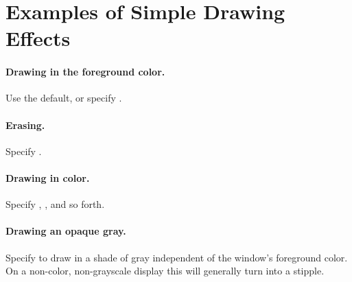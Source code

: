 \section {Examples of Simple Drawing Effects}

\paragraph {Drawing in the foreground color.}

Use the default, or specify .

\paragraph {Erasing.}

Specify .

\paragraph {Drawing in color.}

Specify , , and so forth.

\paragraph {Drawing an opaque gray.}

Specify  to draw in a shade of gray independent
of the window's foreground color.  On a non-color, non-grayscale display this
will generally turn into a stipple.
